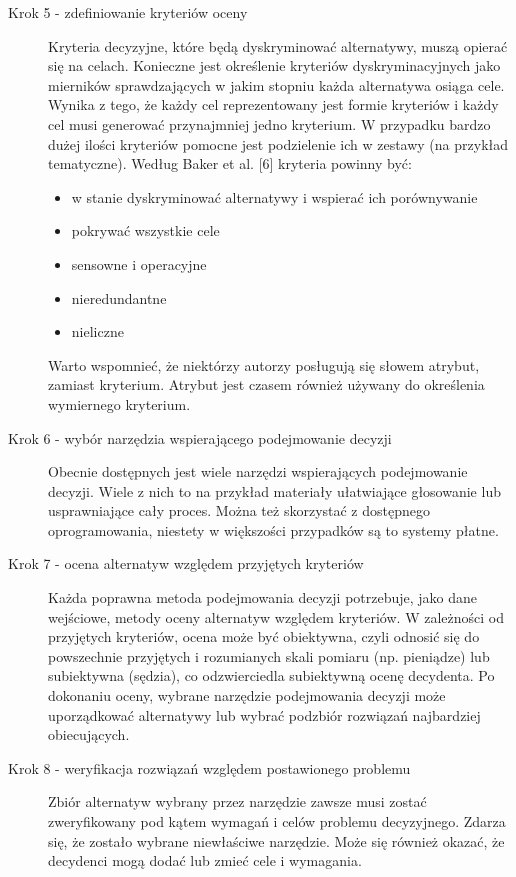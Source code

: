\begin{description}
  \item[Krok 5 - zdefiniowanie kryteriów oceny] Kryteria decyzyjne, które będą
  dyskryminować alternatywy, muszą opierać się na celach. Konieczne jest 
  określenie kryteriów dyskryminacyjnych jako mierników sprawdzających w jakim 
  stopniu każda alternatywa osiąga cele. Wynika z tego, że każdy cel 
  reprezentowany jest formie kryteriów i każdy cel musi generować przynajmniej 
  jedno kryterium. W przypadku bardzo dużej ilości kryteriów pomocne jest 
  podzielenie ich w zestawy (na przykład tematyczne). Według Baker et al.
  [6] kryteria powinny być:
  
  \begin{itemize}
    \item w stanie dyskryminować alternatywy i wspierać ich porównywanie
	\item pokrywać wszystkie cele
	\item sensowne i operacyjne
	\item nieredundantne
	\item nieliczne
  \end{itemize}
  
  Warto wspomnieć, że niektórzy autorzy posługują się słowem atrybut, zamiast 
  kryterium. Atrybut jest czasem również używany do określenia wymiernego
  kryterium.
  
  \item[Krok 6 - wybór narzędzia wspierającego podejmowanie decyzji] 
  Obecnie dostępnych jest wiele narzędzi wspierających podejmowanie decyzji.
  Wiele z nich to na przykład materiały ułatwiające głosowanie lub usprawniające
  cały proces. Można też skorzystać z dostępnego oprogramowania, niestety w
  większości przypadków są to systemy płatne.
  \item[Krok 7 - ocena alternatyw względem przyjętych kryteriów] 
  Każda poprawna metoda podejmowania decyzji potrzebuje, jako dane wejściowe,
  metody oceny alternatyw względem kryteriów. W zależności od przyjętych
  kryteriów, ocena może być obiektywna, czyli odnosić się do powszechnie
  przyjętych i rozumianych skali pomiaru (np. pieniądze) lub subiektywna
  (sędzia), co odzwierciedla subiektywną ocenę decydenta. Po dokonaniu oceny,
  wybrane narzędzie podejmowania decyzji może uporządkować alternatywy lub
  wybrać podzbiór rozwiązań najbardziej obiecujących.
  \item[Krok 8 - weryfikacja rozwiązań względem postawionego problemu] 
  Zbiór alternatyw wybrany przez narzędzie zawsze musi zostać zweryfikowany pod
  kątem wymagań i celów problemu decyzyjnego. Zdarza się, że zostało wybrane
  niewłaściwe narzędzie. Może się również okazać, że decydenci mogą dodać lub
  zmieć cele i wymagania.

\end{description}




